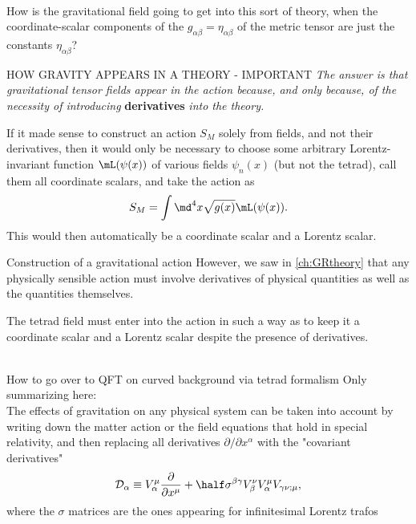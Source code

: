 \\
How is the gravitational field going to get into this sort of theory, when the coordinate-scalar components of the $g_{\alpha \beta}=\eta_{\alpha \beta}$ of the metric tensor are just the constants $\eta_{\alpha \beta}$?
\begin{mybox}{HOW GRAVITY APPEARS IN A THEORY - IMPORTANT}
	\emph{The answer is that gravitational tensor fields appear in the action because, and only because, of the necessity of introducing} \textbf{derivatives} \emph{into the theory.}
\end{mybox}
If it made sense to construct an action $S_M$ solely from fields, and not their derivatives, then it would only be necessary to choose some arbitrary Lorentz-invariant function $\mL(\psi(x))$ of various fields $\psi_n(x)$ (but not the tetrad), call them all coordinate scalars, and take the action as 
\begin{equation}
	S_M = \int \md^4 x \sqrt{g(x)} \mL(\psi(x)).
\end{equation}
This would then automatically be a coordinate scalar and a Lorentz scalar.
\begin{mybox}{Construction of a gravitational action}
	However, we saw in \ref{ch:GRtheory} that any physically sensible action must involve derivatives of physical quantities as well as the quantities themselves.
\end{mybox}
The tetrad field must enter into the action in such a way as to keep it a coordinate scalar and a Lorentz scalar despite the presence of derivatives.
\\
\\
\begin{mybox}{How to go over to QFT on curved background via tetrad formalism}
	Only summarizing here:\\
	The effects of gravitation on any physical system can be taken into account by writing down the matter action or the field equations that hold in special relativity, and then replacing all derivatives $\partial/\partial x^\alpha$ with the "covariant derivatives"
	\begin{equation}
	\mathcal{D}_\alpha \equiv V_\alpha^\mu \frac{\partial}{\partial x^\mu} + \half  \sigma^{\beta \gamma} V^\nu_\beta V^\mu_\alpha V_{\gamma \nu;\mu},
	\end{equation}
	where the $\sigma$ matrices are the ones appearing for infinitesimal Lorentz trafos 
\end{mybox}
